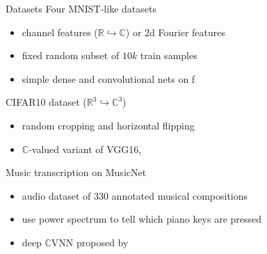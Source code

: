 \documentclass{beamer}
\newcommand{\real}{\mathbb{R}}
\newcommand{\cplx}{\mathbb{C}}
\begin{document}
\begin{frame}[t]{Datasets}{\insertsection}
  Four MNIST-like datasets
  \begin{itemize}
    \item channel features ($\real \hookrightarrow \cplx$) or $2$d Fourier features
    \item fixed random subset of $10k$ train samples
    \item simple dense and convolutional nets on f
  \end{itemize}

  \medskip
  CIFAR10 dataset ($\real^3 \hookrightarrow \cplx^3$)
  \begin{itemize}
    \item random cropping and horizontal flipping
    \item $\cplx$-valued variant of VGG16, \citep{simonyan_very_2015}
  \end{itemize}

  \medskip
  Music transcription on MusicNet \citep{thickstun_learning_2017}
  \begin{itemize}
    \item audio dataset of $330$ annotated musical compositions
    \item use power spectrum to tell which piano keys are pressed
    \item deep $\cplx$VNN proposed by \citep{trabelsi_deep_2018}
  \end{itemize}
\end{frame}
\end{document}
